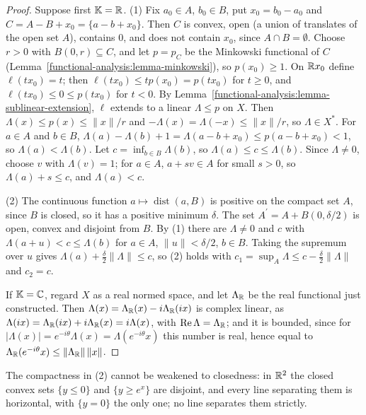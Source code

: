 \begin{proof}
Suppose first $\mathbb{K} = \mathbb{R}$. (1) Fix $a_0 \in A$, $b_0 \in B$, put $x_0 = b_0 - a_0$ and $C = A - B + x_0 = \{a - b + x_0\}$. Then $C$ is convex, open (a union of translates of the open set $A$), contains
$0$, and does not contain $x_0$, since $A \cap B = \emptyset$. Choose $r > 0$ with $B(0, r) \subseteq C$, and let $p = p_C$ be the Minkowski functional of $C$
(Lemma~\ref{functional-analysis:lemma-minkowski}), so $p(x_0) \geq 1$. On $\mathbb{R} x_0$ define $\ell(tx_0) = t$; then
$\ell(tx_0) \leq tp(x_0) = p(tx_0)$ for $t \geq 0$, and $\ell(tx_0) \leq 0 \leq p(tx_0)$ for $t < 0$. By Lemma~\ref{functional-analysis:lemma-sublinear-extension}, $\ell$ extends to a linear $\Lambda \leq p$ on $X$. Then
$\Lambda(x) \leq p(x) \leq \|x\|/r$ and $-\Lambda(x) = \Lambda(-x) \leq \|x\|/r$, so $\Lambda \in X^*$. For $a \in A$ and $b \in B$, $\Lambda(a) - \Lambda(b) + 1 = \Lambda(a - b + x_0) \leq p(a - b + x_0) < 1$, so
$\Lambda(a) < \Lambda(b)$. Let $c = \inf_{b \in B}\Lambda(b)$, so $\Lambda(a) \leq c \leq \Lambda(b)$. Since $\Lambda \neq 0$, choose $v$ with $\Lambda(v) = 1$; for $a \in A$, $a + sv \in A$ for small $s > 0$, so
$\Lambda(a) + s \leq c$, and $\Lambda(a) < c$.

(2) The continuous function $a \mapsto \operatorname{dist}(a, B)$ is positive on the compact set $A$, since $B$ is closed, so it has a positive minimum $\delta$. The set $A^{\prime} = A + B(0, \delta/2)$ is open, convex and disjoint
from $B$. By (1) there are $\Lambda \neq 0$ and $c$ with $\Lambda(a + u) < c \leq \Lambda(b)$ for $a \in A$, $\|u\| < \delta/2$, $b \in B$. Taking the supremum over $u$ gives $\Lambda(a) + \frac{\delta}{2}\|\Lambda\| \leq c$,
so (2) holds with $c_1 = \sup_A\Lambda \leq c - \frac\delta2\|\Lambda\|$ and $c_2 = c$.

If $\mathbb{K} = \mathbb{C}$, regard $X$ as a real normed space, and let $\Lambda_{\mathbb{R}}$ be the real functional just constructed. Then $\Lambda(x) = \Lambda_{\mathbb{R}}(x) - i\Lambda_{\mathbb{R}}(ix)$ is complex linear, as
$\Lambda(ix) = \Lambda_{\mathbb{R}}(ix) + i\Lambda_{\mathbb{R}}(x) = i\Lambda(x)$, with $\operatorname{Re}\Lambda = \Lambda_{\mathbb{R}}$; and it is bounded, since for $|\Lambda(x)| = e^{-i\theta}\Lambda(x) = \Lambda(e^{-i\theta}x)$ this number is real, hence equal to
$\Lambda_{\mathbb{R}}(e^{-i\theta}x) \leq \|\Lambda_{\mathbb{R}}\|\,\|x\|$.
\end{proof}

The compactness in (2) cannot be weakened to closedness: in $\mathbb{R}^2$ the closed convex sets $\{y \leq 0\}$ and $\{y \geq e^x\}$ are disjoint, and every line separating them is horizontal, with $\{y = 0\}$
the only one; no line separates them strictly.

